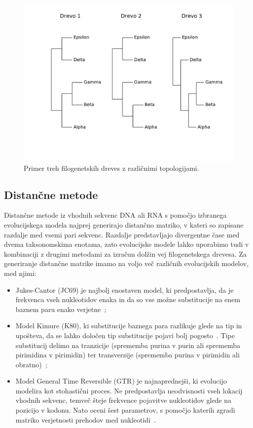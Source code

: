 \documentclass[a4paper, 12pt]{book}
\begin{document}
\begin{figure}
	\begin{center}
		\includegraphics[scale=0.7, clip=true, trim=0 3cm 0 9mm]{gfx/input_trees_ex.pdf}
	\end{center}
	\caption{Primer treh filogenetskih dreves z različnimi topologijami.}
	\label{img-input-trees}
\end{figure}

\subsection{Distančne metode}
Distančne metode iz vhodnih sekvenc DNA ali RNA s pomočjo izbranega evolucijskega 
modela najprej generirajo distančno matriko, v kateri so zapisane razdalje med 
vsemi pari sekvenc. Razdalje predstavljajo divergentne čase med dvema taksonomskima 
enotama, zato evolucijske modele lahko uporabimo tudi v kombinaciji z drugimi 
metodami za izračun dolžin vej filogenetskega drevesa. Za generiranje distančne 
matrike imamo na voljo več različnih evolucijskih modelov, med njimi:
	\begin{itemize}
		\item Jukes-Cantor (JC69) je najbolj enostaven model, ki predpostavlja, 
			  da je frekvenca vseh nukleotidov enaka in da so vse možne 
			  substitucije na enem baznem paru enako verjetne~\cite{jc};
		\item Model Kimure (K80), ki substitucije baznega para razlikuje glede 
			  na tip in upošteva, da se lahko določen tip substitucije pojavi 
			  bolj pogosto~\cite{k80}. Tipe substitucij delimo na tranzicije 
			  (sprememba purina v purin ali sprememba pirimidina v pirimidin) 
			  ter transverzije (sprememba purina v pirimidin ali obratno)~\cite{fel};
		\item Model General Time Reversible (GTR) je najnaprednejši, ki 
			  evolucijo modelira kot stohastični proces. Ne predpostavlja 
			  neodvisnosti vseh lokacij vhodnih sekvenc, temveč šteje frekvence 
			  pojavitve nukleotidov glede na pozicijo v kodonu. Nato oceni šest
			  parametrov, s pomočjo katerih zgradi matriko verjetnosti
			  prehodov med nukleotidi~\cite{gtr}.
	\end{itemize}
\end{document}
